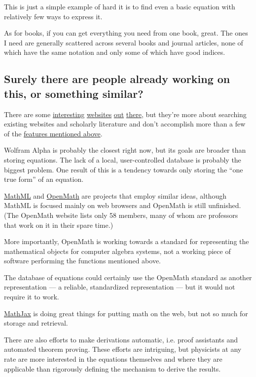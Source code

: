 \documentclass[12pt,letterpaper]{article}
\begin{document}
This is just a simple example of hard it is to find even a basic equation with relatively few ways to express it.


As for books, if you can get everything you need from one book, great. The ones I need are generally scattered across several books and journal articles, none of which have the same notation and only some of which have good indices.

\subsection{Surely there are people already working on this, or something similar?}

There are some
\href{http://symbolab.com/}
{interesting}
\href{http://latexsearch.com/}
{websites}
\href{http://www.dessci.com/en/reference/searching/math-searching.htm}
{out}
\href{http://www.equationsheet.com/}
{there},
but they're more about searching existing websites and scholarly literature
and don't accomplish more than a few of the \hyperref[sec:features]{features mentioned above}.

Wolfram Alpha is probably the closest right now,
but its goals are broader than storing equations.
The lack of a local, user-controlled database is probably the biggest problem.
One result of this is a tendency towards only storing the ``one true form'' of an equation.

\href{http://www.w3.org/Math/}
{MathML}
and
\href{http://www.openmath.org/}
{OpenMath} are projects that employ similar ideas,
although MathML is focused mainly on web browsers and OpenMath is still unfinished.
(The OpenMath website lists only 58 members,
many of whom are professors that work on it in their spare time.)

More importantly,
OpenMath is working towards a standard for representing the mathematical objects for computer algebra systems,
not a working piece of software performing the functions mentioned above.

The database of equations could certainly use the OpenMath standard as another representation
--- a reliable, standardized representation ---
but it would not require it to work.

\href{http://www.mathjax.org/}
{MathJax} is doing great things for putting math on the web,
but not so much for storage and retrieval.

There are also efforts to make derivations automatic,
i.e. proof assistants and automated theorem proving.
These efforts are intriguing,
but physicists at any rate are more interested in the equations themselves and where they are applicable
than rigorously defining the mechanism to derive the results.
\end{document}
